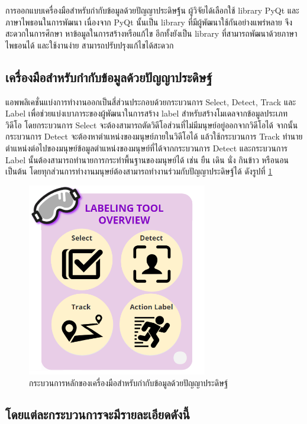 การออกแบบเครื่องมือสำหรับกำกับข้อมูลด้วยปัญญาประดิษฐ์้น ผู้วิจัยได้เลือกใช้ library PyQt และภาษาไพธอนในการพัฒนา
เนื่องจาก PyQt นั้นเป็น library ที่มีผู้พัฒนาใช้กันอย่างแพร่หลาย จึงสะดวกในการศึกษา หาข้อมูลในการสร้างหรือแก้ไข
อีกทั้งยังเป็น library ที่สามารถพัฒนาด้วยภาษาไพธอนได้ และใช้งานง่าย สามารถปรับปรุงแก้ไขได้สะดวก

\subsection{เครื่องมือสำหรับกำกับข้อมูลด้วยปัญญาประดิษฐ์}
แอพพลิเคชั่นแบ่งการทำงานออกเป็นสี่ส่วนประกอบด้วยกระบวนการ Select, Detect, Track และ Label
เพื่อช่วยแบ่งเบาภาระของผู้พัฒนาในการสร้าง label สำหรับสร้างโมเดลจากข้อมูลประเภทวิดีโอ โดยกระบวนการ Select
จะต้องสามารถตัดวิดีโอส่วนที่ไม่มีมนุษย์อยู่ออกจากวิดีโอได้ จากนั้นกระบวนการ Detect จะต้องหาตำแหน่งของมนุษย์ภายในวิดีโอได้
แล้วใช้กระบวนการ Track ทำนายตำแหน่งต่อไปของมนุษย์ข้อมูลตำแหน่งของมนุษย์ที่ได้จากกระบวนการ Detect
และกระบวนการ Label นั้นต้องสามารถทำนายการกระทำพื้นฐานของมนุษย์ได้ เช่น ยืน เดิน นั่ง กินข้าว หรือนอน เป็นต้น 
โดยทุกส่วนการทำงานมนุษย์ต้องสามารถทำงานร่วมกับปัญญาประดิษฐ์ได้
ดังรูปที่ \ref{fig:labeling_overview}

\begin{figure}[!ht]
    \centering
    \includegraphics[width=0.7\textwidth]{chapter3/images/3_6/labelingToolOverview.png}
    \caption{กระบวนการหลักของเครื่องมือสำหรับกำกับข้อมูลด้วยปัญญาประดิษฐ์}
    \label{fig:labeling_overview}
\end{figure}
\clearpage

\subsection*{โดยแต่ละกระบวนการจะมีรายละเอียดดังนี้}
